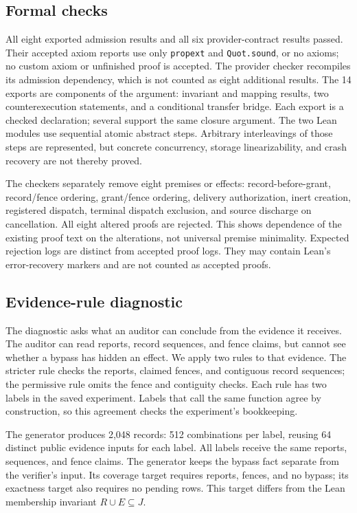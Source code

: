 \documentclass[letterpaper]{article}
\newcommand{\code}[1]{\texttt{#1}}
\begin{document}
\subsection{Formal checks}
All eight exported admission results and all six provider-contract results
passed. Their accepted axiom reports use only \code{propext} and
\code{Quot.sound}, or no axioms; no custom axiom or unfinished proof is accepted.
The provider checker recompiles its admission dependency, which is not counted
as eight additional results.
The 14 exports are components of the argument: invariant and mapping results,
two counterexecution statements, and a conditional transfer bridge. Each export
is a checked declaration; several support the same closure argument. The two Lean modules use sequential atomic abstract
steps. Arbitrary interleavings of those steps are represented, but concrete
concurrency, storage linearizability, and crash recovery are not thereby proved.

The checkers separately remove eight premises or effects: record-before-grant,
record/fence ordering, grant/fence ordering, delivery authorization, inert
creation, registered dispatch, terminal dispatch exclusion, and source discharge
on cancellation. All eight altered proofs are rejected. This shows dependence
of the existing proof text on the alterations, not universal premise minimality.
Expected rejection logs are distinct from accepted proof logs. They may contain
Lean's error-recovery markers and are not counted as accepted proofs.

\subsection{Evidence-rule diagnostic}
\label{sec:diagnostic}
The diagnostic asks what an auditor can conclude from the evidence it receives.
The auditor can read reports, record sequences, and fence claims, but cannot
see whether a bypass has hidden an effect. We apply two rules to that evidence.
The stricter rule checks the reports, claimed fences, and contiguous record
sequences; the permissive rule omits the fence and contiguity checks. Each rule
has two labels in the saved experiment. Labels that call the same function
agree by construction, so this agreement checks the experiment's bookkeeping.

The generator produces 2,048 records: 512 combinations per label, reusing 64
distinct public evidence inputs for each label. All labels receive the same
reports, sequences, and fence claims. The generator keeps the bypass fact
separate from the verifier's input. Its coverage target requires reports,
fences, and no bypass; its exactness target also requires no pending rows.
This target differs from the Lean membership invariant $R\cup E\subseteq J$.
\end{document}
